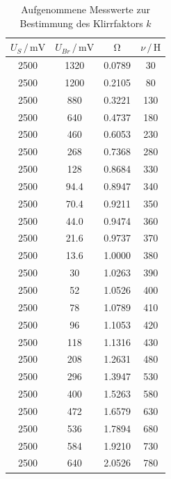 \begin{table}[h]
\normalsize
\centering
{}
\begin{tabular}{c c c c}
\toprule
        $U_{S} \,/\,\si{\milli\volt}$ & $U_{Br} \,/\,\si{\milli\volt}$ & $\upOmega$ & $\nu \,/\, \si{\henry}$ \\
        \midrule
        2500 & 1320 &           0.0789 & 30 \\
        2500 & 1200 &           0.2105 & 80 \\
        2500 & 880 &            0.3221 & 130 \\
        2500 & 640 &            0.4737 & 180 \\
        2500 & 460 &            0.6053 & 230 \\
        2500 & 268 &            0.7368 & 280 \\
        2500 & 128 &            0.8684 & 330 \\
        2500 & 94.4 &           0.8947 & 340 \\
        2500 & 70.4 &           0.9211 & 350 \\
        2500 & 44.0 &           0.9474 & 360 \\
        2500 & 21.6 &           0.9737 & 370 \\
        2500 & 13.6 &           1.0000 & 380 \\   
        2500 & 30 &             1.0263 & 390 \\
        2500 & 52 &             1.0526 & 400 \\
        2500 & 78 &             1.0789 & 410 \\
        2500 & 96 &             1.1053 & 420 \\
        2500 & 118 &            1.1316 & 430 \\
        2500 & 208 &            1.2631 & 480 \\
        2500 & 296 &            1.3947 & 530 \\
        2500 & 400 &            1.5263 & 580 \\
        2500 & 472 &            1.6579 & 630 \\
        2500 & 536 &            1.7894 & 680 \\
        2500 & 584 &            1.9210 & 730 \\
        2500 & 640 &            2.0526 & 780 \\
        
\bottomrule
\end{tabular}
\caption{Aufgenommene Messwerte zur Bestimmung des Klirrfaktors $k$} 
\label{tab:7}
\end{table}


